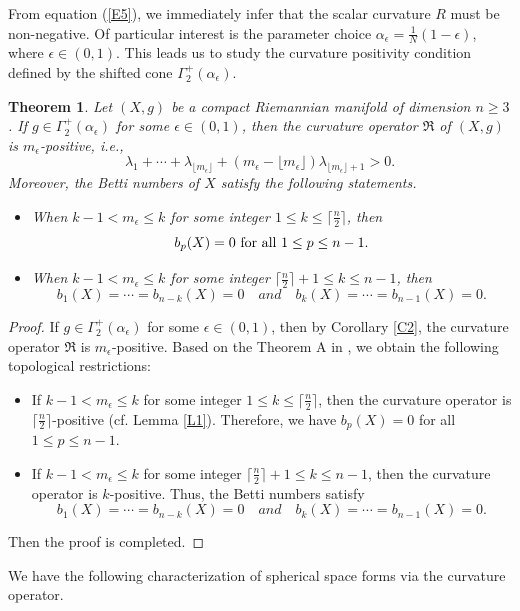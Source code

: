 \documentclass[12pt, twoside]{article}
\newtheorem{theorem}{Theorem}[section]
\theoremstyle{definition}
\numberwithin{equation}{section}
\def \a {\alpha }
\begin{document}
From equation (\ref{E5}), we immediately infer that the scalar curvature $R$ must be non-negative. Of particular interest is the parameter choice $\a_{\epsilon}=\frac{1}{N}(1-\epsilon)$, where $\epsilon\in(0,1)$. This leads us to study the curvature positivity condition defined by the shifted cone $\Gamma^{+}_{2}(\a_{\epsilon})$. 
\begin{theorem}\label{T2}
Let $(X,g)$ be a compact Riemannian manifold of dimension $n\geq 3$. If
$g\in\Gamma^{+}_{2}(\a_{\epsilon})$ for some $\epsilon\in(0,1)$, then the curvature operator $\mathfrak{R}$ of $(X,g)$ is $m_{\epsilon}$-positive, i.e., 
$$\lambda_{1}+\cdots+\lambda_{\lfloor m_{\epsilon}\rfloor}+(m_{\epsilon}-\lfloor m_{\epsilon}\rfloor)\lambda_{\lfloor m_{\epsilon}\rfloor+1 }>0.$$
Moreover, the Betti numbers of $X$ satisfy the following statements.
\begin{itemize}
\item[(i)] When $k-1<m_{\epsilon}\leq k$  for some integer $1\leq k\leq \lceil\frac{n}{2}\rceil$, then
 $$b_{p}(X)=0\ {\rm{for\ all}}\ 1\leq p\leq n-1.$$
\item[(ii)] When $k-1<m_{\epsilon}\leq k$  for some integer $ \lceil\frac{n}{2}\rceil+1\leq k\leq n-1$, then
$$b_{1}(X)=\cdots=b_{n-k}(X)=0\quad and\quad b_{k}(X)=\cdots=b_{n-1}(X)=0.$$
\end{itemize}
\end{theorem}
\begin{proof}
If $g\in\Gamma^{+}_{2}(\a_{\epsilon})$ for some $\epsilon\in(0,1)$, then by Corollary \ref{C2}, the curvature operator $\mathfrak{R}$ is  $m_{\epsilon}$-positive. Based on the Theorem A in \cite{PW21a}, we obtain the following topological restrictions:
\begin{itemize}
\item[Case (i).] If $k-1<m_{\epsilon}\leq k$  for some integer $1\leq k\leq \lceil\frac{n}{2}\rceil$, then the curvature operator is $\lceil\frac{n}{2}\rceil$-positive (cf. Lemma \ref{L1}). Therefore, we have $b_{p}(X)=0$ for all $1\leq p\leq n-1$.
\item[Case (ii).]  If $k-1<m_{\epsilon}\leq k$ for some integer $ \lceil\frac{n}{2}\rceil+1\leq k\leq n-1$, then the curvature operator is $k$-positive. Thus, the Betti numbers satisfy 
$$b_{1}(X)=\cdots=b_{n-k}(X)=0\quad and\quad b_{k}(X)=\cdots=b_{n-1}(X)=0.$$
\end{itemize}
Then the proof is completed.
\end{proof}
We have the following characterization of spherical space forms via the curvature operator.
\end{document}
